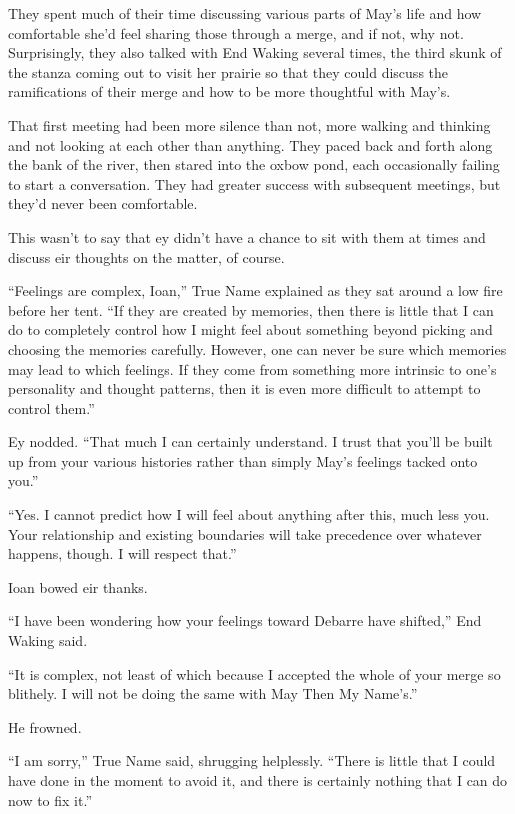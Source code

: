 They spent much of their time discussing various parts of May's life and how comfortable she'd feel sharing those through a merge, and if not, why not. Surprisingly, they also talked with End Waking several times, the third skunk of the stanza coming out to visit her prairie so that they could discuss the ramifications of their merge and how to be more thoughtful with May's.

That first meeting had been more silence than not, more walking and thinking and not looking at each other than anything. They paced back and forth along the bank of the river, then stared into the oxbow pond, each occasionally failing to start a conversation. They had greater success with subsequent meetings, but they'd never been comfortable.

This wasn't to say that ey didn't have a chance to sit with them at times and discuss eir thoughts on the matter, of course.

``Feelings are complex, Ioan,'' True Name explained as they sat around a low fire before her tent. ``If they are created by memories, then there is little that I can do to completely control how I might feel about something beyond picking and choosing the memories carefully. However, one can never be sure which memories may lead to which feelings. If they come from something more intrinsic to one's personality and thought patterns, then it is even more difficult to attempt to control them.''

Ey nodded. ``That much I can certainly understand. I trust that you'll be built up from your various histories rather than simply May's feelings tacked onto you.''

``Yes. I cannot predict how I will feel about anything after this, much less you. Your relationship and existing boundaries will take precedence over whatever happens, though. I will respect that.''

Ioan bowed eir thanks.

``I have been wondering how your feelings toward Debarre have shifted,'' End Waking said.

``It is complex, not least of which because I accepted the whole of your merge so blithely. I will not be doing the same with May Then My Name's.''

He frowned.

``I am sorry,'' True Name said, shrugging helplessly. ``There is little that I could have done in the moment to avoid it, and there is certainly nothing that I can do now to fix it.''

